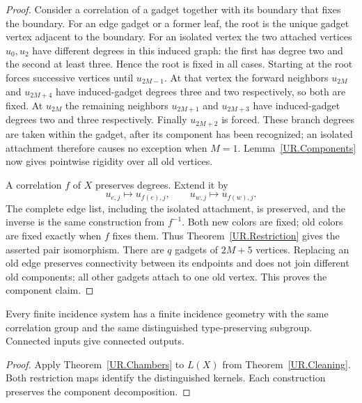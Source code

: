 \begin{proof}
Consider a correlation of a gadget together with its boundary that fixes the
boundary. For an edge gadget or a former leaf, the root is the unique gadget
vertex adjacent to the boundary. For an isolated vertex the two attached
vertices $u_0,u_2$ have different degrees in this induced graph: the first has
degree two and the second at least three. Hence the root is fixed in all cases.
Starting at the root forces successive vertices until $u_{2M-1}$. At that
vertex the forward neighbors $u_{2M}$ and $u_{2M+4}$ have induced-gadget
degrees three and two respectively, so both are fixed. At $u_{2M}$ the
remaining neighbors $u_{2M+1}$ and $u_{2M+3}$ have induced-gadget degrees two
and three respectively. Finally $u_{2M+2}$ is forced. These branch degrees
are taken within the gadget, after its component has been recognized; an
isolated attachment therefore causes no exception when $M=1$.
Lemma~\ref{UR.Components} now gives pointwise rigidity over all old vertices.

A correlation $f$ of $X$ preserves degrees. Extend it by
\[
 u_{e,j}\longmapsto u_{f(e),j},\qquad
 u_{w,j}\longmapsto u_{f(w),j}.
\]
The complete edge list, including the isolated attachment, is preserved, and
the inverse is the same construction from $f^{-1}$. Both new colors are fixed;
old colors are fixed exactly when $f$ fixes them. Thus
Theorem~\ref{UR.Restriction} gives the asserted pair isomorphism.
There are $q$ gadgets of $2M+5$ vertices. Replacing an old edge preserves
connectivity between its endpoints and does not join different old components;
all other gadgets attach to one old vertex. This proves the component claim.
\end{proof}

\begin{corollary}\label{UR.Conversion}
Every finite incidence system has a finite incidence geometry with the same
correlation group and the same distinguished type-preserving subgroup.
Connected inputs give connected outputs.
\end{corollary}
\begin{proof}
Apply Theorem~\ref{UR.Chambers} to $L(X)$ from Theorem~\ref{UR.Cleaning}.
Both restriction maps identify the distinguished kernels. Each construction
preserves the component decomposition.
\end{proof}
